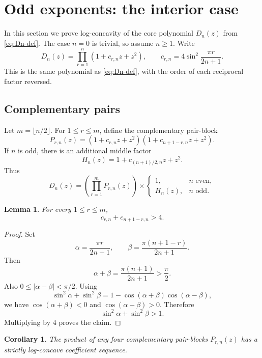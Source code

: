 \documentclass[11pt]{amsart}
\newtheorem{lemma}[theorem]{Lemma}
\newtheorem{corollary}[theorem]{Corollary}
\begin{document}
\section{Odd exponents: the interior case}\label{sec:odd}

In this section we prove log-concavity of the core polynomial \(D_n(z)\) from \eqref{eq:Dn-def}.  The case \(n=0\) is trivial, so assume \(n\ge1\).  Write
\[
        D_n(z)=\prod_{r=1}^n(1+c_{r,n}z+z^2),
        \qquad
        c_{r,n}=4\sin^2\frac{\pi r}{2n+1}.
\]
This is the same polynomial as \eqref{eq:Dn-def}, with the order of each reciprocal factor reversed.

\subsection{Complementary pairs}

Let \(m=\lfloor n/2\rfloor\).  For \(1\le r\le m\), define the complementary pair-block
\begin{equation}\label{eq:odd-pair-block}
        P_{r,n}(z)=(1+c_{r,n}z+z^2)(1+c_{n+1-r,n}z+z^2).
\end{equation}
If \(n\) is odd, there is an additional middle factor
\[
        H_n(z)=1+c_{(n+1)/2,n}z+z^2.
\]
Thus
\begin{equation}\label{eq:Dn-paired}
        D_n(z)=
        \left(\prod_{r=1}^mP_{r,n}(z)\right)
        \times
        \begin{cases}
        1, & n\text{ even},\\
        H_n(z), & n\text{ odd}.
        \end{cases}
\end{equation}

\begin{lemma}\label{lem:odd-pair-sum}
For every \(1\le r\le m\),
\[
        c_{r,n}+c_{n+1-r,n}>4.
\]
\end{lemma}

\begin{proof}
Set
\[
        \alpha=\frac{\pi r}{2n+1},
        \qquad
        \beta=\frac{\pi(n+1-r)}{2n+1}.
\]
Then
\[
        \alpha+\beta=\frac{\pi(n+1)}{2n+1}>\frac\pi2.
\]
Also \(0\le |\alpha-\beta|<\pi/2\).  Using
\[
        \sin^2\alpha+\sin^2\beta
        =1-\cos(\alpha+\beta)\cos(\alpha-\beta),
\]
we have \(\cos(\alpha+\beta)<0\) and \(\cos(\alpha-\beta)>0\).  Therefore
\[
        \sin^2\alpha+\sin^2\beta>1.
\]
Multiplying by \(4\) proves the claim.
\end{proof}

\begin{corollary}\label{cor:odd-four-pairs-lc}
The product of any four complementary pair-blocks \(P_{r,n}(z)\) has a strictly log-concave coefficient sequence.
\end{corollary}
\end{document}
